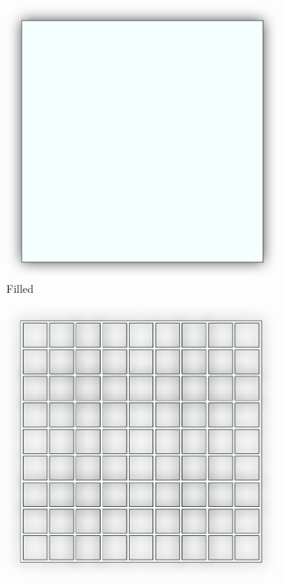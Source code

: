\documentclass[12pt, letterpaper]{article}
\begin{document}
\begin{figure}[H]
	\caption{Test Parts}
	\label{fig:parts}
	\begin{subfigure}[b]{.3\linewidth}
		\includegraphics[width=\linewidth]{filled}
		\caption{Filled}
	\end{subfigure}
	\begin{subfigure}[b]{.3\linewidth}
		\includegraphics[width=\linewidth]{square}

\end{subfigure}
\end{figure}
\end{document}
